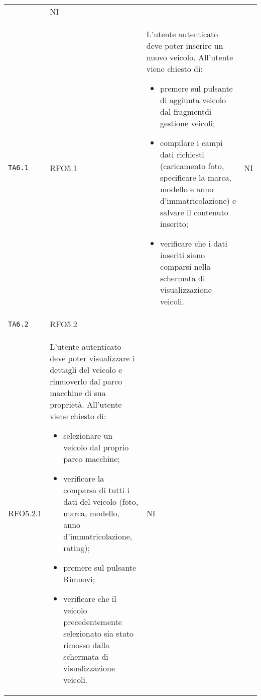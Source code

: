 \begin{longtable}{ >{\centering}p{} >{\centering}p{} >{\centering}p{}
			>{\centering}p{}}
\begin{itemize}
		 \end{itemize}	&	NI	\tabularnewline
		 \texttt{TA6.1} & RFO5.1 &	L'utente autenticato deve poter inserire un nuovo veicolo. All'utente viene chiesto di:
		 \begin{itemize}
		 	\item premere sul pulsante di aggiunta veicolo dal fragment\glosp di gestione veicoli;
		 	\item compilare i campi dati richiesti (caricamento foto, specificare la marca, modello e anno d'immatricolazione) e salvare il contenuto inserito;
		 	\item verificare che i dati inseriti siano comparsi nella schermata di visualizzazione veicoli.
		 \end{itemize}	&	NI	\tabularnewline
		 \texttt{TA6.2} & RFO5.2 \\ RFO5.2.1 &	L'utente autenticato deve poter visualizzare i dettagli del veicolo e rimuoverlo dal parco macchine di sua proprietà. All'utente viene chiesto di:
		 \begin{itemize}
		 	\item selezionare un veicolo dal proprio parco macchine;
		 	\item verificare la comparsa di tutti i dati del veicolo (foto, marca, modello, anno d'immatricolazione, rating);
		 	\item premere sul pulsante Rimuovi;
		 	\item verificare che il veicolo precedentemente selezionato sia stato rimosso dalla schermata di visualizzazione veicoli.
		 \end{itemize}	&	NI	\tabularnewline
		 

\end{longtable}
